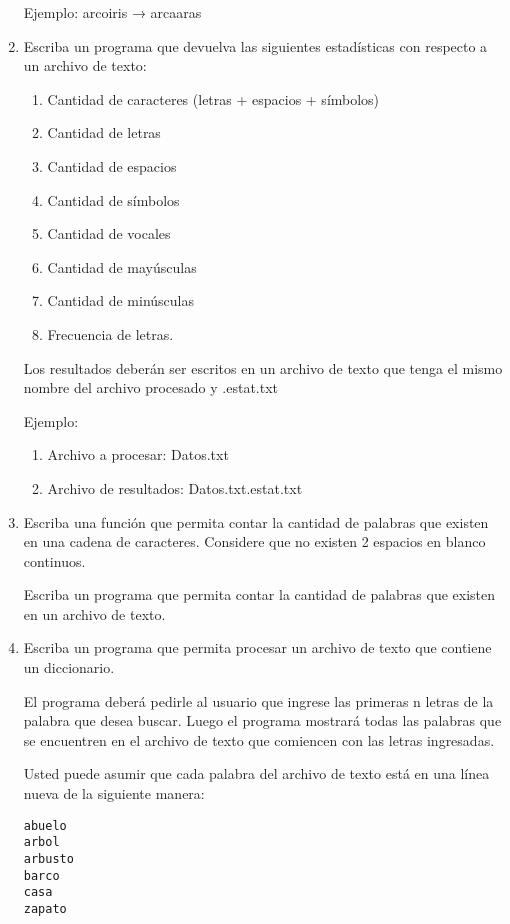 \documentclass[a4paper]{article}
\begin{document}
\begin{enumerate}
	Ejemplo: arcoiris → arcaaras
  \item Escriba un programa que devuelva las siguientes estadísticas con
        respecto a un archivo de texto:
    \begin{enumerate}
      \item Cantidad de caracteres (letras + espacios + símbolos)
      \item Cantidad de letras
      \item Cantidad de espacios
      \item Cantidad de símbolos
      \item Cantidad de vocales
      \item Cantidad de mayúsculas
      \item Cantidad de minúsculas
      \item Frecuencia de letras.
    \end{enumerate}
	Los resultados deberán ser escritos en un archivo de texto que tenga
        el mismo nombre del archivo procesado y .estat.txt

	Ejemplo:

    \begin{enumerate}
      \item Archivo a procesar: Datos.txt
      \item Archivo de resultados: Datos.txt.estat.txt
    \end{enumerate}

  \item Escriba una función que permita contar la cantidad de palabras
        que existen en una cadena de caracteres. Considere que no existen
        2 espacios en blanco continuos.

        Escriba un programa que permita contar la cantidad de palabras
        que existen en un archivo de texto.

  \item Escriba un programa que permita procesar un archivo de texto que
        contiene un diccionario.

        El programa deberá pedirle al usuario que ingrese las primeras n
        letras de la palabra que desea buscar. Luego el programa mostrará
        todas las palabras que se encuentren en el archivo de texto que
        comiencen con las letras ingresadas. 

        Usted puede asumir que cada palabra del archivo de texto está en
        una línea nueva de la siguiente manera:

\begin{lstlisting}
abuelo
arbol
arbusto
barco
casa
zapato
\end{lstlisting}


\end{enumerate}
\end{document}

